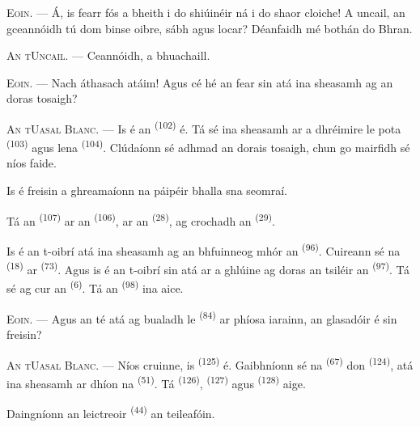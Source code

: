 \textsc{Eoin}. --- Á, is fearr fós a bheith i do shiúinéir ná i do shaor cloiche! A
uncail, an gceannóidh tú dom binse oibre, sábh agus locar? Déanfaidh mé bothán do
Bhran.

\textsc{An tUncail}. --- Ceannóidh, a bhuachaill.

\textsc{Eoin}. --- Nach áthasach atáim! Agus cé hé an fear sin atá ina sheasamh ag
an doras tosaigh?

\VUsaut{3.0mm}
\VUsaut{3.0mm}

\textsc{An tUasal Blanc}. --- Is é an  \textsuperscript{(102)} é.
Tá sé ina sheasamh ar a dhréimire le pota 
\textsuperscript{(103)} agus lena  \textsuperscript{(104)}.
Clúdaíonn sé adhmad an dorais tosaigh, chun go mairfidh sé níos faide.

Is é freisin a ghreamaíonn na páipéir bhalla sna seomraí.

Tá an  \textsuperscript{(107)} ar an 
\textsuperscript{(106)}, ar an  \textsuperscript{(28)}, ag crochadh
an  \textsuperscript{(29)}.

Is é an t-oibrí atá ina sheasamh ag an bhfuinneog mhór an 
\textsuperscript{(96)}. Cuireann sé na  \textsuperscript{(18)} ar
 \textsuperscript{(73)}. Agus is é an t-oibrí sin atá ar a ghlúine
ag doras an tsiléir an  \textsuperscript{(97)}. Tá sé ag cur an
 \textsuperscript{(6)}. Tá an 
\textsuperscript{(98)} ina aice.

\textsc{Eoin}. --- Agus an té atá ag bualadh le 
\textsuperscript{(84)} ar phíosa iarainn, an glasadóir é sin freisin?

\textsc{An tUasal Blanc}. --- Níos cruinne, is 
\textsuperscript{(125)} é. Gaibhníonn sé na 
\textsuperscript{(67)} don  \textsuperscript{(124)}, atá ina
sheasamh ar dhíon na  \textsuperscript{(51)}. Tá
 \textsuperscript{(126)}, 
\textsuperscript{(127)} agus  \textsuperscript{(128)} aige.

Daingníonn an leictreoir  \textsuperscript{(44)} an
teileafóin.

